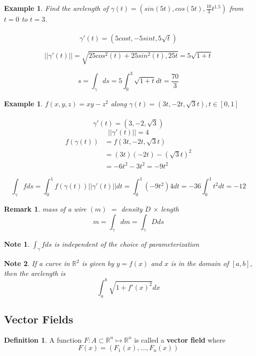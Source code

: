 \documentclass[12pt]{article}
\theoremstyle{plain}
\newtheorem*{remark}{Remark}
\newtheorem*{note}{Note}
\newtheorem{example}[theorem]{Example}
\theoremstyle{definition}
\newtheorem{definition}[theorem]{Definition}
\begin{document}
\begin{example}
	Find the arclength of $\gamma (t) = (sin(5t), cos(5t), \frac{10}{3} t^{1.5})$ from $t=0$ to $t=3$.\\
	\\
	$$\gamma ' (t) = (5cost, -5sint, 5 \sqrt{t})$$

	$$||\gamma ' (t)|| = \sqrt{25cos^2 (t) + 25sin^2 (t), 25 t} = 5\sqrt{1+t}$$

	$$s = \int_\gamma ds = 5 \int_0^3 \sqrt{1+t} dt = \frac{70}{3}$$
\end{example}

\begin{example}
	$f(x,y,z) = xy-z^2$ along $\gamma (t) = (3t, -2t, \sqrt{3}t), t\in [0,1]$\\
	\\
	$$\gamma ' (t) = (3, -2, \sqrt{3})$$
	$$||\gamma ' (t)|| = 4$$
	\begin{align*}
		f(\gamma (t)) &= f(3t, -2t, \sqrt{3}t)\\
		&=(3t)(-2t) - (\sqrt{3}t)^2\\
		&= -6t^2 - 3t^2 = -9t^2
	\end{align*}

	$$\int_\gamma f ds = \int_0^1 f(\gamma (t))||\gamma ' (t)||dt = \int_0^1 (-9t^2)4dt = -36 \int_0^1 t^2 dt = -12$$

\end{example}

\begin{remark}
	mass of a wire $(m)$ $=$ density $D$ $\times$ length
	$$m = \int_\gamma dm = \int_\gamma D ds$$
\end{remark}

\begin{note}
	$\int_\gamma f ds$ is independent of the choice of parameterization
\end{note}

\begin{note}
	If a curve in $\mathbb{R}^2$ is given by $y=f(x)$ and $x$ is in the domain of $[a,b]$, then the arclength is $$\int_a^b \sqrt{1+f'(x)^2} dx$$
\end{note}

\subsection{Vector Fields}

\begin{definition}
	A function $F:A \subset \mathbb{R}^n \mapsto \mathbb{R}^n$ is called a \textbf{vector field} where
	$$F(x) = (F_1(x), ..., F_n(x))$$
\end{definition}
\end{document}

